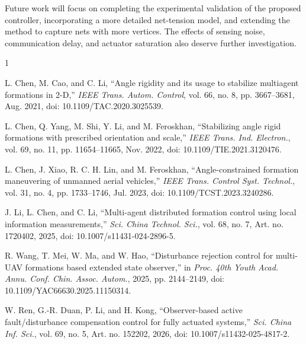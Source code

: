 \documentclass[lettersize,journal]{IEEEtran}
\begin{document}
Future work will focus on completing the experimental validation of the proposed controller, incorporating a more detailed net-tension model, and extending the method to capture nets with more vertices. The effects of sensing noise, communication delay, and actuator saturation also deserve further investigation.

\begin{thebibliography}{1}


L. Chen, M. Cao, and C. Li, ``Angle rigidity and its usage to stabilize multiagent formations in 2-D,'' \textit{IEEE Trans. Autom. Control}, vol. 66, no. 8, pp. 3667--3681, Aug. 2021, doi: 10.1109/TAC.2020.3025539.

L. Chen, Q. Yang, M. Shi, Y. Li, and M. Feroskhan, ``Stabilizing angle rigid formations with prescribed orientation and scale,'' \textit{IEEE Trans. Ind. Electron.}, vol. 69, no. 11, pp. 11654--11665, Nov. 2022, doi: 10.1109/TIE.2021.3120476.

L. Chen, J. Xiao, R. C. H. Lin, and M. Feroskhan, ``Angle-constrained formation maneuvering of unmanned aerial vehicles,'' \textit{IEEE Trans. Control Syst. Technol.}, vol. 31, no. 4, pp. 1733--1746, Jul. 2023, doi: 10.1109/TCST.2023.3240286.

J. Li, L. Chen, and C. Li, ``Multi-agent distributed formation control using local information measurements,'' \textit{Sci. China Technol. Sci.}, vol. 68, no. 7, Art. no. 1720402, 2025, doi: 10.1007/s11431-024-2896-5.

R. Wang, T. Mei, W. Ma, and W. Hao, ``Disturbance rejection control for multi-UAV formations based extended state observer,'' in \textit{Proc. 40th Youth Acad. Annu. Conf. Chin. Assoc. Autom.}, 2025, pp. 2144--2149, doi: 10.1109/YAC66630.2025.11150314.

W. Ren, G.-R. Duan, P. Li, and H. Kong, ``Observer-based active fault/disturbance compensation control for fully actuated systems,'' \textit{Sci. China Inf. Sci.}, vol. 69, no. 5, Art. no. 152202, 2026, doi: 10.1007/s11432-025-4817-2.

\end{thebibliography}
\end{document}
